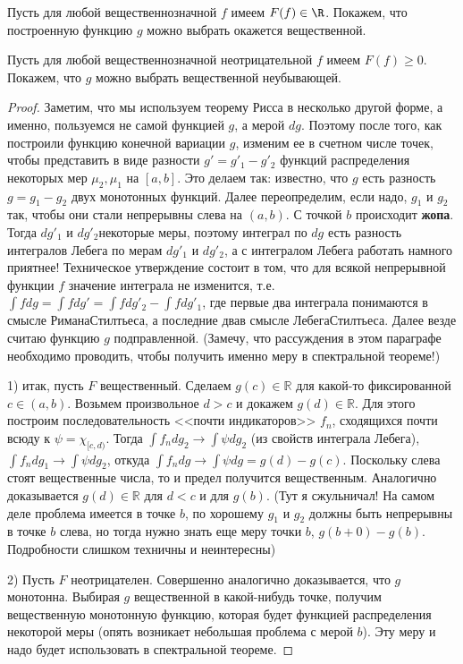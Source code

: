 \documentclass[a4paper]{article}
\begin{document}
\begin{stm}
Пусть для любой вещественнозначной $f$ имеем $F(f)\in\R$. Покажем, что построенную
функцию $g$ можно выбрать окажется вещественной.

Пусть для любой вещественнозначной неотрицательной $f$ имеем $F(f)\ge 0$. Покажем, что $g$
можно выбрать вещественной неубывающей.
\end{stm}
\begin{proof}
Заметим, что мы используем теорему Рисса в несколько другой форме, а именно, пользуемся не самой
функцией $g$, а мерой $dg$. Поэтому после того, как построили функцию конечной вариации $g$,
изменим ее в счетном числе точек, чтобы представить в виде разности $g'=g'_1-g'_2$ функций
распределения некоторых мер $\mu_2,\mu_1$ на $[a,b]$. Это делаем так: известно, что $g$
есть разность $g=g_1-g_2$ двух монотонных функций. Далее переопределим, если надо, $g_1$ и $g_2$
так, чтобы они стали непрерывны слева на $(a,b)$. С точкой $b$ происходит \textbf{жопа}.
Тогда $dg'_1$ и $dg'_2$\т некоторые меры, поэтому интеграл по $dg$ есть разность интегралов
Лебега по мерам $dg'_1$ и $dg'_2$, а с интегралом Лебега работать намного приятнее!
Техническое утверждение \cite[гл.~6, \S~6, п.~4]{kf} состоит в том, что для всякой непрерывной
функции $f$ значение интеграла не изменится, т.е. $\int fdg=\int fdg'=\int fdg'_2-\int fdg'_1$,
где первые два интеграла понимаются в смысле Римана\ч Стилтьеса, а последние два\т в
смысле Лебега\ч Стилтьеса. Далее везде считаю функцию $g$ подправленной. (Замечу, что рассуждения
в этом параграфе необходимо проводить, чтобы получить именно меру в спектральной теореме!)

1) итак, пусть $F$ вещественный. Сделаем $g(c)\in\mathbb R$ для какой-то фиксированной
$c\in(a,b)$. Возьмем произвольное $d>c$ и докажем $g(d)\in\mathbb R$. Для этого построим последовательность
<<почти индикаторов>> $f_n$, сходящихся почти всюду к $\psi=\chi_{[c,d)}$. Тогда
$\int f_ndg_2\to\int\psi dg_2$ (из свойств интеграла Лебега), $\int f_ndg_1\to\int\psi dg_2$,
откуда $\int f_ndg\to\int\psi dg=g(d)-g(c)$. Поскольку слева стоят вещественные числа, то и
предел получится вещественным. Аналогично доказывается $g(d)\in\mathbb R$ для $d<c$ и
для $g(b)$. (Тут я сжульничал! На самом деле проблема имеется в точке $b$, по хорошему $g_1$
и $g_2$ должны быть непрерывны в точке $b$ слева, но тогда нужно знать еще меру точки $b$, 
$g(b+0)-g(b)$. Подробности слишком техничны и неинтересны)

2) Пусть $F$ неотрицателен. Совершенно аналогично доказывается, что $g$ монотонна. Выбирая $g$
вещественной в какой-нибудь точке, получим вещественную монотонную функцию, которая будет функцией
распределения некоторой меры (опять возникает небольшая проблема с мерой $b$). Эту меру и надо
будет использовать в спектральной теореме.
\end{proof}
\end{document}
